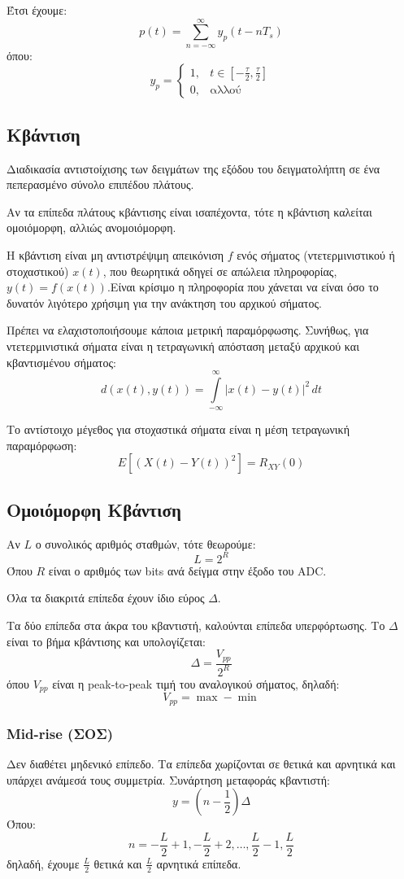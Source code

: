 \documentclass[a4paper,12pt]{article}
\begin{document}
Έτσι έχουμε:
\[
p(t)=\sum_{n=-\infty}^{\infty} y_p (t-nT_s)
\]
όπου:
\[
y_p=\begin{cases}
1, & t \in [-\frac{\tau}{2}, \frac{\tau}{2}] \\
0, & \text{αλλού}
\end{cases}
\]

\subsection*{Κβάντιση}
Διαδικασία αντιστοίχισης των δειγμάτων της εξόδου του δειγματολήπτη σε ένα πεπερασμένο σύνολο επιπέδου πλάτους.

Αν τα επίπεδα πλάτους κβάντισης είναι ισαπέχοντα, τότε η κβάντιση καλείται ομοιόμορφη, αλλιώς ανομοιόμορφη.

Η κβάντιση είναι μη αντιστρέψιμη απεικόνιση \(f\) ενός σήματος (ντετερμινιστικού ή στοχαστικού) \(x(t)\), που θεωρητικά οδηγεί σε απώλεια πληροφορίας, \(y(t)=f(x(t))\).Είναι κρίσιμο η πληροφορία που χάνεται να είναι όσο το δυνατόν λιγότερο χρήσιμη για την ανάκτηση του αρχικού σήματος.

Πρέπει να ελαχιστοποιήσουμε κάποια μετρική παραμόρφωσης. Συνήθως, για ντετερμινιστικά σήματα είναι η τετραγωνική απόσταση μεταξύ αρχικού και κβαντισμένου σήματος:
\[
d(x(t),y(t))=\int\limits_{-\infty}^{\infty} |x(t)-y(t)|^2 \, dt
\]

Το αντίστοιχο μέγεθος για στοχαστικά σήματα είναι η μέση τετραγωνική παραμόρφωση:
\[
E[(X(t)-Y(t))^2]=R_{XY}(0)
\]

\subsection*{Ομοιόμορφη Κβάντιση}
Αν \(L\) ο συνολικός αριθμός σταθμών, τότε θεωρούμε:
\[
L=2^R
\]
Όπου \(R\) είναι ο αριθμός των bits ανά δείγμα στην έξοδο του ADC.

Όλα τα διακριτά επίπεδα έχουν ίδιο εύρος \(\Delta\).

Τα δύο επίπεδα στα άκρα του κβαντιστή, καλούνται επίπεδα υπερφόρτωσης. Το \(\Delta\) είναι το βήμα κβάντισης και υπολογίζεται:
\[
\Delta = \frac{V_{pp}}{2^R}
\]
όπου \(V_{pp}\) είναι η peak-to-peak τιμή του αναλογικού σήματος, δηλαδή:
\[
V_{pp} = \max - \min
\]

\subsubsection*{Mid-rise (ΣΟΣ)}
Δεν διαθέτει μηδενικό επίπεδο. Τα επίπεδα χωρίζονται σε θετικά και αρνητικά και υπάρχει ανάμεσά τους συμμετρία. Συνάρτηση μεταφοράς κβαντιστή:
\[
y=\left(n-\frac{1}{2}\right) \Delta
\]
Όπου:
\[
n=-\frac{L}{2}+1,-\frac{L}{2}+2, \dots, \frac{L}{2}-1,\frac{L}{2}
\]
δηλαδή, έχουμε \(\frac{L}{2}\) θετικά και \(\frac{L}{2}\) αρνητικά επίπεδα.
\end{document}
